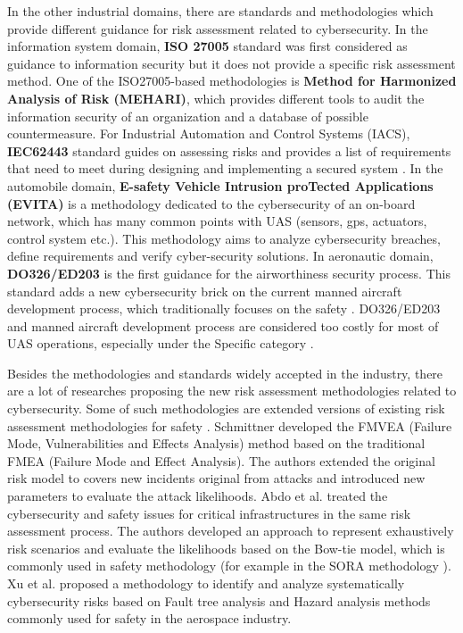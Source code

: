 \documentclass[a4paper, 10, conference]{ieeeconf}  %
\begin{document}
In the other industrial domains, there are standards and methodologies which provide different guidance for risk assessment related to cybersecurity. In the information system domain, \textbf{ISO 27005} standard was first considered as guidance to information security but it does not provide a specific risk assessment method\cite{iso27005}. One of the ISO27005-based methodologies is \textbf{Method for Harmonized Analysis of Risk (MEHARI)}\cite{MEHARIOverview}, which provides different tools to audit the information security of an organization and a database of possible countermeasure. For Industrial Automation and Control Systems (IACS), \textbf {IEC62443} standard guides on assessing risks and provides a list of requirements that need to meet during designing and implementing a secured system \cite{CSIAC-2016}. In the automobile domain, \textbf{E-safety Vehicle Intrusion proTected Applications (EVITA)}\cite{article-EVITA_2007} \cite{evita23} is a methodology dedicated to the cybersecurity of an on-board network, which has many common points with UAS (sensors, gps, actuators, control system etc.). This methodology aims to analyze cybersecurity breaches, define requirements and verify cyber-security solutions. In aeronautic domain, \textbf{DO326/ED203} is the first guidance for the airworthiness security process. This standard adds a new cybersecurity brick on the current manned aircraft development process, which traditionally focuses on the safety \cite{ED202}. DO326/ED203 and manned aircraft development process are considered too costly for most of UAS operations, especially under the Specific category \cite{A-NPA2015}. 

Besides the methodologies and standards widely accepted in the industry, there are a lot of researches proposing the new risk assessment methodologies related to cybersecurity. Some of such methodologies are extended versions of existing risk assessment methodologies for safety \cite{bondavalli_security_2014, abdo:tel-01829574, jonsson_integrated_1998, 7490632, kriaa_joint_nodate}. Schmittner developed the FMVEA (Failure Mode, Vulnerabilities  and  Effects Analysis) method  based on the traditional FMEA (Failure  Mode  and  Effect  Analysis)\cite{bondavalli_security_2014}. The authors extended the original risk model to covers new incidents original from attacks and introduced new parameters to evaluate the attack likelihoods. Abdo et al.\cite{abdo:tel-01829574} treated the cybersecurity and safety issues for critical infrastructures in the same risk assessment process. The authors developed an approach to represent exhaustively risk scenarios and evaluate the likelihoods based on the Bow-tie model, which is commonly used in safety methodology (for example in the SORA methodology \cite{dlr121660}). Xu et al. \cite{7490632} proposed a methodology to identify and analyze systematically cybersecurity risks based on Fault tree analysis and Hazard analysis methods commonly used for safety in the aerospace industry.
\end{document}
